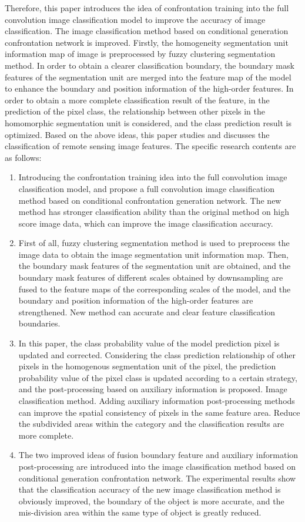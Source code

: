 \begin{eabstract}
  Therefore, this paper introduces the idea of ​​confrontation training into the full convolution image classification model to improve the accuracy of image classification. The image classification method based on conditional generation confrontation network is improved. Firstly, the homogeneity segmentation unit information map of image is preprocessed by fuzzy clustering segmentation method. In order to obtain a clearer classification boundary, the boundary mask features of the segmentation unit are merged into the feature map of the model to enhance the boundary and position information of the high-order features. In order to obtain a more complete classification result of the feature, in the prediction of the pixel class, the relationship between other pixels in the homomorphic segmentation unit is considered, and the class prediction result is optimized. Based on the above ideas, this paper studies and discusses the classification of remote sensing image features. The specific research contents are as follows:
\begin{enumerate}[(1)]
  \item Introducing the confrontation training idea into the full convolution image classification model, and propose a full convolution image classification method based on conditional confrontation generation network. The new method has stronger classification ability than the original method on high score image data, which can improve the image classification accuracy.
  \item First of all, fuzzy clustering segmentation method is used to preprocess the image data to obtain the image segmentation unit information map. Then, the boundary mask features of the segmentation unit are obtained, and the boundary mask features of different scales obtained by downsampling are fused to the feature maps of the corresponding scales of the model, and the boundary and position information of the high-order features are strengthened. New method can accurate and clear feature classification boundaries.
  \item In this paper, the class probability value of the model prediction pixel is updated and corrected. Considering the class prediction relationship of other pixels in the homogenous segmentation unit of the pixel, the prediction probability value of the pixel class is updated according to a certain strategy, and the post-processing based on auxiliary information is proposed. Image classification method. Adding auxiliary information post-processing methods can improve the spatial consistency of pixels in the same feature area. Reduce the subdivided areas within the category and the classification results are more complete.
  \item The two improved ideas of fusion boundary feature and auxiliary information post-processing are introduced into the image classification method based on conditional generation confrontation network. The experimental results show that the classification accuracy of the new image classification method is obviously improved, the boundary of the object is more accurate, and the mis-division area within the same type of object is greatly reduced.
  

\end{enumerate}
\end{eabstract}
